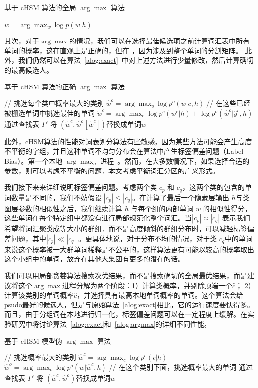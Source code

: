 \begin{algorithm}[!ht]
\caption{基于 cHSM 算法的全局 $\arg\max$ 算法}\label{alog:alls}
 {$w=\arg\max_w \log p(w|h)$}\;
\end{algorithm}

其次，对于$\arg\max $的情况，我们可以在选择最佳候选项之前计算词汇表中所有单词的概率，这在直观上是正确的，但在
，因为涉及到整个单词的分割矩阵。 此外，我们仍然可以在算法~\ref{alog:exact}~中对上述方法进行少量修改，然后计算确切的最高候选人。
\begin{algorithm}[!t]
\caption{基于 cHSM 算法的正确 $\arg\max$ 算法}\label{alog:exact}
{// 挑选每个类中概率最大的类别}\;
 {$\hat w^o=\arg\max_o{\log p^o(w| c,h)}$ }\;
 {// 在这些已经被栅选单词中挑选最佳的单词}
 {$\tilde w^c=\arg\max_c{\log p^c(w^c|h)+\log p^o(\hat w^o|\hat y^c,h)}$}\;
通过查找表 $\Gamma'$ 将 $(\tilde w^c,\hat w^o[\tilde w^c])$替换成单词$w$ \;
\end{algorithm}


此外，cHSM算法的性能对词表划分算法有些敏感，因为某些方法可能会产生高度不平衡的字组，并且这种单词不均匀分布会在算法中产生标签偏差问题（Label Bias）。第一个本地 $\arg\max_o$ 进程~。然而，在大多数情况下，如果选择合适的参数，则可以考虑不平衡的问题，本文考虑平衡词汇分区的广义形式。

我们接下来来详细说明标签偏差问题。考虑两个类 $ c_p $ 和 $ c_q $，这两个类的包含的单词数量是不同的，我们不妨假设 $| c_p | \le | c_q |$。在计算了最后一个隐藏层输出 $h$与类图层参数的相似性之后，我们继续计算 $h$ 与每个组的内部单词 $w$ 的相似性得分，这些单词在每个特定组中都没有进行局部规范化整个词汇。当$ | c_p | \approx|c_q|$ 表示我们希望将词汇聚类成等大小的群组，而不是高度倾斜的群组分布时，可以减轻标签偏差问题，其中$ | c_p | \ll | c_q | $ 。更具体地说，对于分布不均的情况，对于类 $ c_q $中的单词来说这个概率被一大群单词稀释是不公平的，这样算法更有可能以较高的概率取出这个小组中的单词，放弃在其他大集团有更多的潜在的话。

我们可以用局部贪婪算法搜索次优结果，而不是搜索确切的全局最优结果，而是建议将这个$ \arg\max $进程分解为两个阶段：1）计算类概率，并剔除顶端一个$ \hat c $； 2）计算该类别的单词概率$ \hat c $，并选择具有最高本地单词概率的单词。这个算法会给psudo最好的候选人，但是与原始算法~\ref{alog:exact}相比，它的运行速度要快得多。而且，由于分组词在本地进行归一化，标签偏差问题可以在一定程度上缓解。在实验研究中将讨论算法~\ref{alog:exact}和~\ref{alog:argmax}的详细不同性能。
\begin{algorithm}[!t]
 \caption{基于 cHSM 模型伪 $\arg\max$ 算法}\label{alog:cargmax}
{// 挑选概率最大的类别}\;
 {$\hat w^c=\arg\max_c{\log p^c(c|h)}$ }\;
 {$\hat w^o=\arg\max_o{\log p^o(w|\hat w^c,h)}$}\;
 {// 在这个类别下面，挑选概率最大的单词}\;
 {通过查找表 $\Gamma'$ 将 $(\hat w^c,\hat w^o)$替换成单词$w$ }\;
\end{algorithm}

